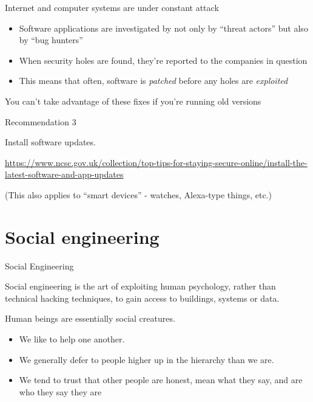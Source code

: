 \documentclass[xcolor=table]{beamer}
\begin{document}
\begin{frame}{Internet and computer systems are under constant attack}
	\begin{itemize}
		\item Software applications are investigated by not only by ``threat actors'' but also by ``bug hunters'' 
		\item When security holes are found, they're reported to the companies in question
		\item This means that often, software is \emph{patched} before any holes are \emph{exploited}
	\end{itemize}

	You can't take advantage of these fixes if you're running old versions
\end{frame}
\begin{frame}{Recommendation 3}

	Install software updates. 

	\vspace{0.5em}

	\url{https://www.ncsc.gov.uk/collection/top-tips-for-staying-secure-online/install-the-latest-software-and-app-updates}

	\vspace{0.5em} 

	(This also applies to ``smart devices'' - watches, Alexa-type things, etc.)

\end{frame}

\section{Social engineering }

\begin{frame}{Social Engineering}

Social engineering is the art of exploiting human psychology,
rather than technical hacking techniques, to gain access to
buildings, systems or data.

Human beings are essentially social creatures.

	\begin{itemize}
		\item We like to help one another.
		\item We generally defer to people higher up in the hierarchy than we are.  
		\item We tend to trust that other people are honest, mean what they say, and are who they say they are
	\end{itemize}
\end{frame}
\end{document}
